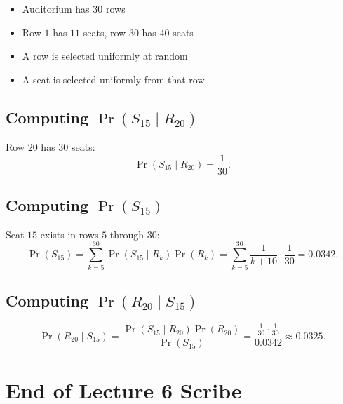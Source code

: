 \documentclass[11pt]{article}
\begin{document}
\begin{itemize}
    \item Auditorium has $30$ rows
    \item Row $1$ has $11$ seats, row $30$ has $40$ seats
    \item A row is selected uniformly at random
    \item A seat is selected uniformly from that row
\end{itemize}

\subsection{Computing $\Pr(S_{15}\mid R_{20})$}

Row $20$ has $30$ seats:
\[
\Pr(S_{15}\mid R_{20})=\frac{1}{30}.
\]

\subsection{Computing $\Pr(S_{15})$}

Seat $15$ exists in rows $5$ through $30$:
\[
\Pr(S_{15})
=\sum_{k=5}^{30}\Pr(S_{15}\mid R_k)\Pr(R_k)
=\sum_{k=5}^{30}\frac{1}{k+10}\cdot\frac{1}{30}
=0.0342.
\]

\subsection{Computing $\Pr(R_{20}\mid S_{15})$}

\[
\Pr(R_{20}\mid S_{15})
=\frac{\Pr(S_{15}\mid R_{20})\Pr(R_{20})}{\Pr(S_{15})}
=\frac{\frac{1}{30}\cdot\frac{1}{30}}{0.0342}
\approx0.0325.
\]

\section*{End of Lecture 6 Scribe}
\end{document}
